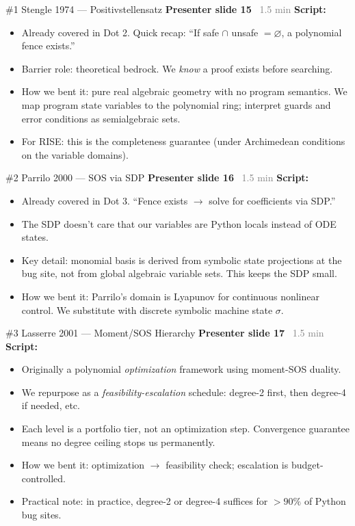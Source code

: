 \documentclass[aspectratio=169]{beamer}
\newcommand{\syncline}[2]{\textbf{#1} \hfill \textcolor{gray}{#2}}
\begin{document}

\begin{frame}{\#1 Stengle 1974 --- Positivstellensatz}
\syncline{Presenter slide 15}{~1.5 min}
\textbf{Script:}
\begin{itemize}
  \item Already covered in Dot 2. Quick recap: ``If safe $\cap$ unsafe $= \varnothing$, a polynomial fence exists.''
  \item Barrier role: theoretical bedrock. We \emph{know} a proof exists before searching.
  \item How we bent it: pure real algebraic geometry with no program semantics. We map program state variables to the polynomial ring; interpret guards and error conditions as semialgebraic sets.
  \item For RISE: this is the completeness guarantee (under Archimedean conditions on the variable domains).
\end{itemize}
\end{frame}

\begin{frame}{\#2 Parrilo 2000 --- SOS via SDP}
\syncline{Presenter slide 16}{~1.5 min}
\textbf{Script:}
\begin{itemize}
  \item Already covered in Dot 3. ``Fence exists $\to$ solve for coefficients via SDP.''
  \item The SDP doesn't care that our variables are Python locals instead of ODE states.
  \item Key detail: monomial basis is derived from symbolic state projections at the bug site, not from global algebraic variable sets. This keeps the SDP small.
  \item How we bent it: Parrilo's domain is Lyapunov for continuous nonlinear control. We substitute with discrete symbolic machine state $\sigma$.
\end{itemize}
\end{frame}

\begin{frame}{\#3 Lasserre 2001 --- Moment/SOS Hierarchy}
\syncline{Presenter slide 17}{~1.5 min}
\textbf{Script:}
\begin{itemize}
  \item Originally a polynomial \emph{optimization} framework using moment-SOS duality.
  \item We repurpose as a \emph{feasibility-escalation} schedule: degree-2 first, then degree-4 if needed, etc.
  \item Each level is a portfolio tier, not an optimization step. Convergence guarantee means no degree ceiling stops us permanently.
  \item How we bent it: optimization $\to$ feasibility check; escalation is budget-controlled.
  \item Practical note: in practice, degree-2 or degree-4 suffices for $>90\%$ of Python bug sites.
\end{itemize}
\end{frame}
\end{document}
